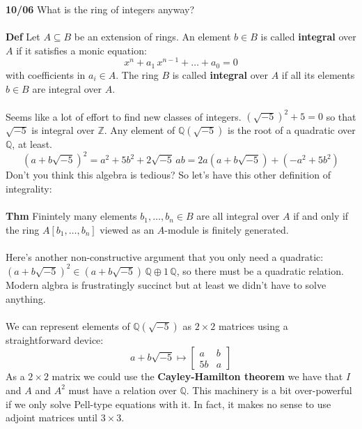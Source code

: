 \documentclass[12pt]{article}
\begin{document}
\noindent \textbf{10/06} What is the ring of integers anyway?  \\ \\
\textbf{Def} Let $A \subseteq B$ be an extension of rings. An element $b \in B$ is called \textbf{integral} over $A$ if it satisfies a monic equation:
$$  x^n + a_1 \, x^{n-1} + \dots + a_0 = 0 $$
with coefficients in $a_i \in A$.  The ring $B$ is called \textbf{integral} over $A$ if all its elements $b \in B$ are integral over $A$. \\ \\
Seems like a lot of effort to find new classes of integers.  $(\sqrt{-5})^2 + 5 = 0$ so that $\sqrt{-5}$ is integral over $\mathbb{Z}$.  Any element of $\mathbb{Q}(\sqrt{-5})$ is the root of a quadratic over $\mathbb{Q}$, at least.
$$ (a + b \sqrt{-5})^2 = a^2 + 5b^2 + 2 \sqrt{-5} \, ab = 2a(a + b \sqrt{-5}) + ( - a^2 + 5b^2) $$
Don't you think this algebra is tedious?  So let's have this other definition of integrality: \\ \\
\textbf{Thm} Finintely many elements $b_1, \dots, b_n \in B$ are all integral over $A$ if and only if the ring $A[b_1, \dots, b_n]$ viewed as an $A$-module is finitely generated. \\ \\
Here's another non-constructive argument that you only need a quadratic: $ (a+b\sqrt{-5})^2 \in (a + b \sqrt{-5}) \, \mathbb{Q}\oplus 1 \, \mathbb{Q}$, so there must be a quadratic relation.  Modern algbra is frustratingly succinct but at least we didn't have to solve anything. \\ \\
We can represent elements of $\mathbb{Q}(\sqrt{-5})$ as $2 \times 2$ matrices using a straightforward device:
$$ a + b \sqrt{-5} \mapsto \left[ \begin{array}{cc} a & b \\ 5b & a \end{array} \right] $$
As a $2 \times 2$ matrix we could use the \textbf{Cayley-Hamilton theorem} we have that $I$ and $A$ and $A^2$ must have a relation over $\mathbb{Q}$.  This machinery is a bit over-powerful if we only solve Pell-type equations with it.  In fact, it makes no sense to use adjoint matrices until $3 \times 3$.  
\end{document}

